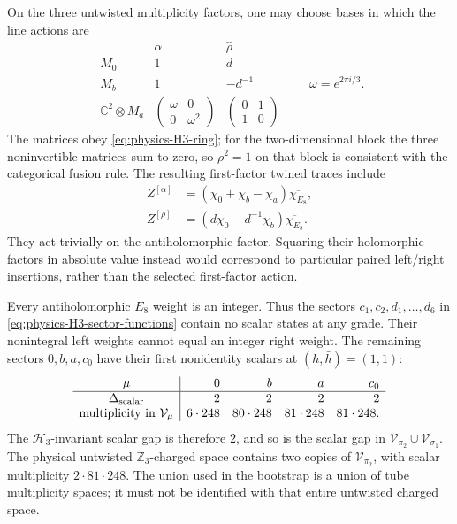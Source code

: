 \documentclass[11pt,a4paper]{article}
\theoremstyle{definition}
\begin{document}
On the three untwisted multiplicity factors, one may choose bases in
which the line actions are
\begin{equation}
 \begin{array}{c|cc}
   &\widehat\alpha&\widehat\rho\\\hline
   M_0&1&d\\
   M_b&1&-d^{-1}\\
   \mathbb C^2\otimes M_a&
    \begin{pmatrix}\omega&0\\0&\omega^2\end{pmatrix}&
    \begin{pmatrix}0&1\\1&0\end{pmatrix}
 \end{array}
 \qquad \omega=e^{2\pi i/3}.
 \label{eq:physics-H3-action}
\end{equation}
The matrices obey \eqref{eq:physics-H3-ring}; for the two-dimensional
block the three noninvertible matrices sum to zero, so $\rho^2=1$ on
that block is consistent with the categorical fusion rule.
The resulting first-factor twined traces include
\begin{align}
 Z^{[\alpha]}&=(\chi_0+\chi_b-\chi_a)\overline{\chi_{E_8}},\\
 Z^{[\rho]}&=(d\chi_0-d^{-1}\chi_b)\overline{\chi_{E_8}}.
 \label{eq:physics-H3-twined}
\end{align}
They act trivially on the antiholomorphic factor. Squaring their
holomorphic factors in absolute value instead would correspond to
particular paired left/right insertions, rather than the selected
first-factor action.

Every antiholomorphic $E_8$ weight is an integer. Thus the sectors
$c_1,c_2,d_1,\ldots,d_6$ in
\eqref{eq:physics-H3-sector-functions} contain no scalar states at
any grade. Their nonintegral left weights cannot equal an integer
right weight. The remaining sectors $0,b,a,c_0$ have their first
nonidentity scalars at $(h,\bar h)=(1,1)$:
\begin{equation}
 \begin{array}{c|rrrr}
 \mu&0&b&a&c_0\\\hline
 \Delta_{\rm scalar}&2&2&2&2\\
 \text{multiplicity in }\mathcal V_\mu&6\cdot248&80\cdot248&81\cdot248&81\cdot248.
 \end{array}
 \label{eq:physics-H3-scalar-table}
\end{equation}
The $\mathcal H_3$-invariant scalar gap is therefore $2$, and so is
the scalar gap in $\mathcal V_{\pi_2}\cup\mathcal V_{\sigma_1}$.
The physical untwisted $\mathbb Z_3$-charged space contains two copies
of $\mathcal V_{\pi_2}$, with scalar multiplicity $2\cdot81\cdot248$.
The union used in the bootstrap is a union of tube multiplicity spaces;
it must not be identified with that entire untwisted charged space.
\end{document}
